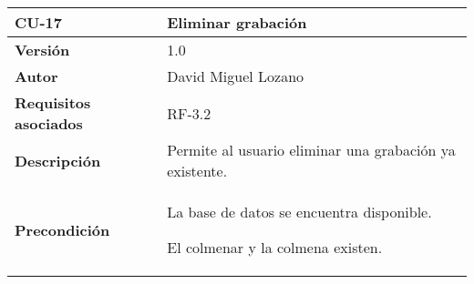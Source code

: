 \begin{longtable}[H]{@{}ll@{}}
\toprule
\begin{minipage}[b]{0.28\columnwidth}\raggedright\strut
\textbf{CU-17}\strut
\end{minipage} & \begin{minipage}[b]{0.66\columnwidth}\raggedright\strut
\textbf{Eliminar grabación}\strut
\end{minipage}\tabularnewline
\midrule
\endhead
\begin{minipage}[t]{0.28\columnwidth}\raggedright\strut
\textbf{Versión}\strut
\end{minipage} & \begin{minipage}[t]{0.66\columnwidth}\raggedright\strut
1.0\strut
\end{minipage}\tabularnewline
\begin{minipage}[t]{0.28\columnwidth}\raggedright\strut
\textbf{Autor}\strut
\end{minipage} & \begin{minipage}[t]{0.66\columnwidth}\raggedright\strut
David Miguel Lozano\strut
\end{minipage}\tabularnewline
\begin{minipage}[t]{0.28\columnwidth}\raggedright\strut
\textbf{Requisitos asociados}\strut
\end{minipage} & \begin{minipage}[t]{0.66\columnwidth}\raggedright\strut
RF-3.2\strut
\end{minipage}\tabularnewline
\begin{minipage}[t]{0.28\columnwidth}\raggedright\strut
\textbf{Descripción}\strut
\end{minipage} & \begin{minipage}[t]{0.66\columnwidth}\raggedright\strut
Permite al usuario eliminar una grabación ya existente.\strut
\end{minipage}\tabularnewline
\begin{minipage}[t]{0.28\columnwidth}\raggedright\strut
\textbf{Precondición}\strut
\end{minipage} & \begin{minipage}[t]{0.66\columnwidth}\raggedright\strut
La base de datos se encuentra disponible.

El colmenar y la colmena existen.


\end{minipage}
\end{longtable}
